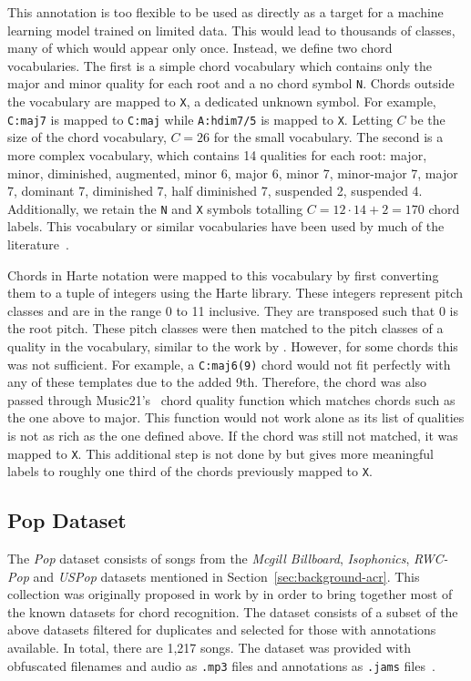 This annotation is too flexible to be used as directly as a target for a machine learning model trained on limited data. This would lead to thousands of classes, many of which would appear only once. Instead, we define two chord vocabularies. The first is a simple chord vocabulary which contains only the major and minor quality for each root and a no chord symbol \texttt{N}. Chords outside the vocabulary are mapped to \texttt{X}, a dedicated unknown symbol. For example, \texttt{C:maj7} is mapped to \texttt{C:maj} while \texttt{A:hdim7/5} is mapped to \texttt{X}. Letting $C$ be the size of the chord vocabulary, $C=26$ for the small vocabulary. The second is a more complex vocabulary, which contains 14 qualities for each root: major, minor, diminished, augmented, minor 6, major 6, minor 7, minor-major 7, major 7, dominant 7, diminished 7, half diminished 7, suspended 2, suspended 4. Additionally, we retain the \texttt{N} and \texttt{X} symbols totalling $C=12\cdot14 + 2 = 170$ chord labels. This vocabulary or similar vocabularies have been used by much of the literature~\citep{StructuredTraining,FourTimelyInsights,ACRLargeVocab1}.

Chords in Harte notation were mapped to this vocabulary by first converting them to a tuple of integers using the Harte library. These integers represent pitch classes and are in the range 0 to 11 inclusive. They are transposed such that 0 is the root pitch. These pitch classes were then matched to the pitch classes of a quality in the vocabulary, similar to the work by \citet{StructuredTraining}. However, for some chords this was not sufficient. For example, a \texttt{C:maj6(9)} chord would not fit perfectly with any of these templates due to the added 9th. Therefore, the chord was also passed through Music21's~\citep{music21} chord quality function which matches chords such as the one above to major. This function would not work alone as its list of qualities is not as rich as the one defined above. If the chord was still not matched, it was mapped to \texttt{X}. This additional step is not done by \citet{StructuredTraining} but gives more meaningful labels to roughly one third of the chords previously mapped to \texttt{X}.

\subsection{Pop Dataset}

The \emph{Pop} dataset consists of songs from the \emph{Mcgill Billboard}, \emph{Isophonics}, \emph{RWC-Pop} and \emph{USPop} datasets mentioned in Section~\ref{sec:background-acr}. This collection was originally proposed in work by \citet{FourTimelyInsights} in order to bring together most of the known datasets for chord recognition. The dataset consists of a subset of the above datasets filtered for duplicates and selected for those with annotations available. In total, there are 1,217 songs. The dataset was provided with obfuscated filenames and audio as \texttt{.mp3} files and annotations as \texttt{.jams} files~\citep{JAMS}. 

